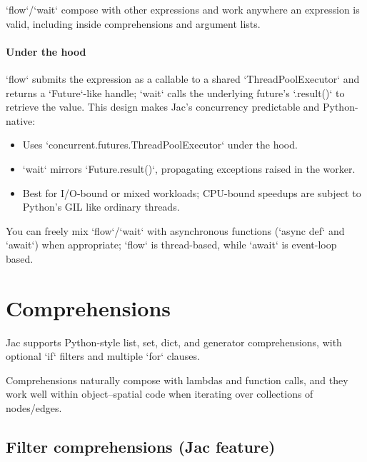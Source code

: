 `flow`/`wait` compose with other expressions and work anywhere an expression is valid, including inside comprehensions and argument lists.

\paragraph{Under the hood}

`flow` submits the expression as a callable to a shared `ThreadPoolExecutor` and returns a `Future`-like handle; `wait` calls the underlying future’s `.result()` to retrieve the value. This design makes Jac’s concurrency predictable and Python-native:

\begin{itemize}
    \item Uses `concurrent.futures.ThreadPoolExecutor` under the hood.
    \item `wait` mirrors `Future.result()`, propagating exceptions raised in the worker.
    \item Best for I/O-bound or mixed workloads; CPU-bound speedups are subject to Python’s GIL like ordinary threads.
\end{itemize}

You can freely mix `flow`/`wait` with asynchronous functions (`async def` and `await`) when appropriate; `flow` is thread-based, while `await` is event-loop based.

\section{Comprehensions}

Jac supports Python-style list, set, dict, and generator comprehensions, with optional `if` filters and multiple `for` clauses.


Comprehensions naturally compose with lambdas and function calls, and they work well within object–spatial code when iterating over collections of nodes/edges.

\subsection{Filter comprehensions (Jac feature)}

